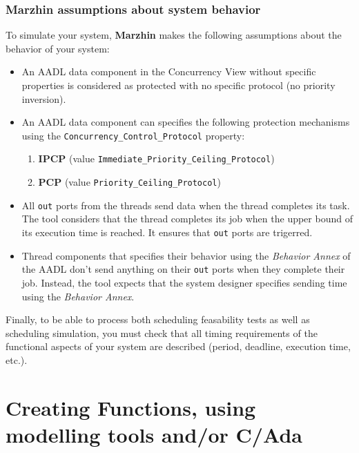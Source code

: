 \documentclass[11pt]{book}
\newcommand{\Concept}[1]{#1\xspace}
\newcommand{\aadl}{\Concept{AADL}}
\begin{document}
   \subsection{Marzhin assumptions about system behavior}
   To simulate your system, \textbf{Marzhin} makes the following assumptions about the
   behavior of your system:
   \begin{itemize}
      \item
         An \aadl data component in the Concurrency View without specific
         properties is considered as protected with no specific protocol (no
         priority inversion).
      \item
         An \aadl data component can specifies the following protection
         mechanisms using the \texttt{Concurrency\_Control\_Protocol} property:
         \begin{enumerate}
            \item
               \textbf{IPCP} (value \texttt{Immediate\_Priority\_Ceiling\_Protocol})
            \item
               \textbf{PCP} (value  \texttt{Priority\_Ceiling\_Protocol})
         \end{enumerate}
      \item
         All \texttt{out} ports from the threads send data when the thread
         completes its task. The tool considers that the thread completes its
         job when the upper bound of its execution time is reached. It ensures
         that \texttt{out} ports are trigerred.
      \item
         Thread components that specifies their behavior using the \textit{Behavior Annex}
         of the \aadl don't send anything on their \texttt{out} ports when they
         complete their job. Instead, the tool expects that the system designer
         specifies sending time using the \textit{Behavior Annex}.
   \end{itemize}


   Finally, to be able to process both scheduling feasability tests as well as
   scheduling simulation, you must check that all timing requirements of the
   functional aspects of your system are described (period, deadline, execution
   time, etc.).

\chapter{Creating Functions, using modelling tools and/or C/Ada}
\label{do_packaging}
\end{document}
